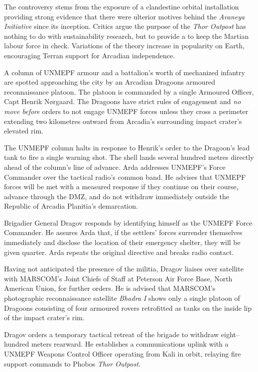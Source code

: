 The controversy stems from the exposure of a clandestine orbital installation providing strong evidence that there were ulterior motives behind the {\it Avaneya Initiative} since its inception. Critics argue the purpose of the {\it Thor Outpost} has nothing to do with sustainability research, but to provide a  to keep the Martian labour force in check. Variations of the theory increase in popularity on Earth, encouraging Terran support for Arcadian independence.
\StopTimelineDate

A column of UNMEPF armour and a battalion's worth of mechanized infantry are spotted approaching the city by an Arcadian Dragoons armoured reconnaissance platoon. The platoon is commanded by a single Armoured Officer, Capt Henrik Nørgaard. The Dragoons have strict rules of engagement and {\it no move before} orders to not engage UNMEPF forces unless they cross a perimeter extending two kilometres outward from Arcadia's surrounding impact crater's elevated rim.

The UNMEPF column halts in response to Henrik's order to the Dragoon's lead tank to fire a single warning shot. The shell lands several hundred metres directly ahead of the column's line of advance. Arda addresses UNMEPF's Force Commander over the tactical radio's common band. He advises that UNMEPF forces will be met with a measured response if they continue on their course, advance through the DMZ, and do not withdraw immediately outside the Republic of Arcadia Planitia's demarcation. 

Brigadier General Dragov responds by identifying himself as the UNMEPF Force Commander. He assures Arda that, if the settlers' forces surrender themselves immediately and disclose the location of their emergency shelter, they will be given quarter. Arda repeats the original directive and breaks radio contact.

Having not anticipated the presence of the militia, Dragov liaises over satellite with MARSCOM's Joint Chiefs of Staff at Peterson Air Force Base, North American Union, for further orders. He is advised that MARSCOM's photographic reconnaissance satellite {\it Bhadra I} shows only a single platoon of Dragoons consisting of four armoured rovers retrofitted as tanks on the inside lip of the impact crater's rim. 

Dragov orders a temporary tactical retreat of the brigade to withdraw eight--hundred meters rearward. He establishes a communications uplink with a UNMEPF Weapons Control Officer operating from Kali in orbit, relaying fire support commands to Phobos {\it Thor Outpost}.
\StopTimelineDate


